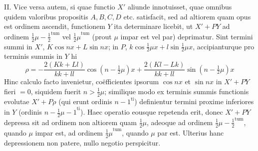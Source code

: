 II. Vice versa autem, si quae functio \(X'\) aliunde innotuisset, quae omnibus quidem valoribus propositis \(A,B,C,D\) etc. satisfacit, sed ad altiorem quam opus est ordinem ascendit, functionem \(Y\) ita determinare licebit, ut \(X'+PY\) ad ordinem \({\frac{1}{2}\mu-\frac{1}{2}}^{\mathrm{tum}}\) vel \({\frac{1}{2}\mu}^{\mathrm{tum}}\) (prout \(\mu\) impar est vel par) deprimatur. Sint termini summi in \(X'\), \(K\cos nx+L\sin nx\); in \(P\), \(k\cos\frac{1}{2}\mu x+l\sin\frac{1}{2}\mu x\), accipianturque pro terminis summis in \(Y\) hi
\[
\rho=-\frac{2(Kk+Ll)}{kk+ll}\cos(n-\tfrac{1}{2}\mu)x
     +\frac{2(Kl-Lk)}{kk+ll}\sin(n-\tfrac{1}{2}\mu)x
\]
Hinc calculo facto invenietur, coëfficientes ipsorum \(\cos nx\) et \(\sin nx\) in \(X'+PY\) fieri \(=0\), siquidem fuerit \(n>\frac{1}{2}\mu\); similique modo ex terminis summis functionis evolutae \(X'+P\rho\) (qui erunt ordinis \({n-1}^{\mathrm{ti}}\)) definientur termini proxime inferiores in \(Y\) (ordinis \({n-\frac{1}{2}\mu-1}^{\mathrm{ti}}\)). Haec operatio eousque repetenda erit, donec \(X'+PY\) depressa sit ad ordinem non altiorem quam \(\frac{1}{2}\mu\), adeoque ad ordinem \({\frac{1}{2}\mu-\frac{1}{2}}^{\mathrm{tum}}\), quando \(\mu\) impar est, ad ordinem \({\frac{1}{2}\mu}^{\mathrm{tum}}\), quando \(\mu\) par est. Ulterius hanc depressionem non patere, nullo negotio perspicitur.

